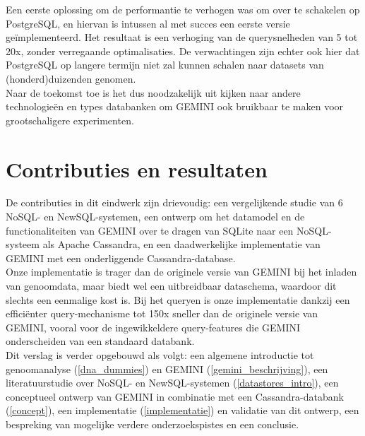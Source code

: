 Een eerste oplossing om de performantie te verhogen was om over te schakelen op PostgreSQL, en hiervan is intussen al met succes een eerste versie ge\"implementeerd. Het resultaat is een verhoging van de querysnelheden van 5 tot 20x, zonder verregaande optimalisaties. De verwachtingen zijn echter ook hier dat PostgreSQL op langere termijn niet zal kunnen schalen naar datasets van (honderd)duizenden genomen.\\
Naar de toekomst toe is het dus noodzakelijk uit kijken naar andere technologie\"en en types databanken om GEMINI ook bruikbaar te maken voor grootschaligere experimenten.

\section{Contributies en resultaten}

De contributies in dit eindwerk zijn drievoudig: een vergelijkende studie van 6 NoSQL- en NewSQL-systemen, een ontwerp om het datamodel en de functionaliteiten van GEMINI over te dragen van SQLite naar een NoSQL-systeem als Apache Cassandra, en een daadwerkelijke implementatie van GEMINI met een onderliggende Cassandra-database.\\
Onze implementatie is trager dan de originele versie van GEMINI bij het inladen van genoomdata, maar biedt wel een uitbreidbaar dataschema, waardoor dit slechts een eenmalige kost is. Bij het queryen is onze implementatie dankzij een effici\"enter query-mechanisme tot 150x sneller dan de originele versie van GEMINI, vooral voor de ingewikkeldere query-features die GEMINI onderscheiden van een standaard databank.\\

Dit verslag is verder opgebouwd als volgt: een algemene introductie tot genoomanalyse (\ref{dna_dummies}) en GEMINI (\ref{gemini_beschrijving}), een literatuurstudie over NoSQL- en NewSQL-systemen (\ref{datastores_intro}), een conceptueel ontwerp van GEMINI in combinatie met een Cassandra-databank (\ref{concept}), een implementatie (\ref{implementatie}) en validatie van dit ontwerp, een bespreking van mogelijke verdere onderzoekspistes en een conclusie.


